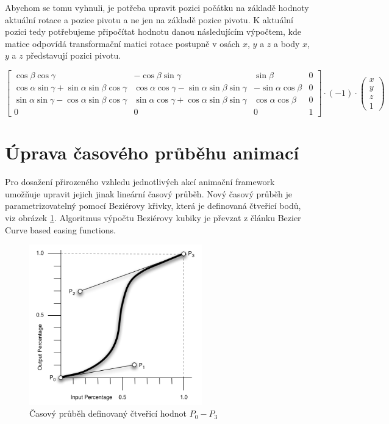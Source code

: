 \documentclass[12pt,a4paper,titlepage,final]{report}
\begin{document}
Abychom se tomu vyhnuli, je potřeba upravit pozici počátku na základě hodnoty aktuální rotace a pozice pivotu a ne jen na základě pozice pivotu. K aktuální pozici tedy potřebujeme připočítat hodnotu danou následujícím výpočtem, kde matice odpovídá transformační matici rotace postupně v osách $x$, $y$ a $z$ a body $x$, $y$ a $z$ představují pozici pivotu.

\begin{equation*}
\begin{bmatrix} 
{\cos \beta \cos \gamma} & {-\cos \beta \sin \gamma } & {\sin \beta} & 0 \\ 
{\cos \alpha \sin \gamma + \sin \alpha \sin \beta \cos \gamma } & {\cos \alpha \cos \gamma - \sin \alpha \sin \beta \sin \gamma } & - {\sin \alpha \cos \beta} & 0 \\ 
{\sin \alpha \sin \gamma - \cos \alpha \sin \beta \cos \gamma} & {\sin \alpha \cos \gamma + \cos \alpha \sin \beta \sin \gamma} & {\cos \alpha \cos \beta} & 0 \\ 
0 & 0 & 0 & 1 \end{bmatrix} 
\cdot ({-1}) 
\cdot 
\begin{pmatrix} 
x \\ y \\ z \\ 1 
\end{pmatrix}
\end{equation*}

\section{Úprava časového průběhu animací}

Pro dosažení přirozeného vzhledu jednotlivých akcí animační framework umožňuje upravit jejich jinak lineární časový průběh. Nový časový průběh je parametrizovatelný pomocí Beziérovy křivky, která je definovaná čtveřicí bodů, viz obrázek \ref{fig:bezier}. Algoritmus výpočtu Beziérovy kubiky je převzat z článku Bezier Curve based easing functions\cite{bezier}.

\begin{figure}
\begin{center}
		\includegraphics[width=7.5cm]{images/timing-function.png}
	\caption{Časový průběh definovaný čtveřicí hodnot $P_0-P_3$\cite{bezier}}
    \label{fig:bezier}
\end{center}
\end{figure}
\end{document}
